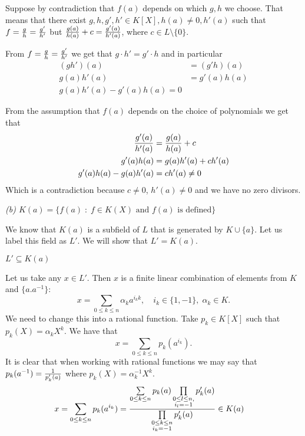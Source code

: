 \documentclass{article}
\begin{document}



Suppose by contradiction that $f(a)$ depends on which $g,h$ we choose. That means that there exist $g,h, g',h'\in K[X], h(a)\neq 0, h'(a)$ such that $f={g\over h}={g'\over h'}$ but ${g(a)\over h(a)}+c= {g'(a)\over h'(a)}$, where $c\in L\setminus\{0\}$. 

From $f={g\over h}={g'\over h'}$ we get that $g\cdot h'=g'\cdot h$ and in particular
\begin{align*}
    (gh')(a)&=(g'h)(a)\\
    g(a)h'(a)&=g'(a)h(a)\\
    g(a)h'(a)-g'(a)h(a)=0
\end{align*}

From the assumption that $f(a)$ depends on the choice of polynomials we get that 
\begin{align*}
    {g'(a)\over h'(a)}&={g(a)\over h(a)}+c\\
    g'(a)h(a)&=g(a)h'(a)+ch'(a)\\
    g'(a)h(a)-g(a)h'(a)&=ch'(a)\neq 0
\end{align*}
Which is a contradiction because $c\neq 0$, $h'(a)\neq 0$ and we have no zero divisors.
\smallskip


\emph{\color{pink}(b) $K(a)=\{f(a)\;:\;f\in K(X)\text{ and }f(a)\text{ is defined}\}$}

We know that $K(a)$ is a subfield of $L$ that is generated by $K\cup\{a\}$. Let us label this field as $L'$. We will show that $L'=K(a)$.

$L'\subseteq K(a)$

Let us take any $x\in L'$. Then $x$ is a finite linear combination of elements from $K$ and $\{a. a^{-1}\}$:
$$x=\sum\limits_{0\leq k\leq n}\alpha_k a^{i_kk},\quad i_k\in\{1,-1\},\;\alpha_k\in K.$$
We need to change this into a rational function. Take $p_k\in K[X]$ such that $p_k(X)=\alpha_kX^k$. We have that
$$x=\sum\limits_{0\leq k\leq n}p_k(a^{i_k}).$$
It is clear that when working with rational functions we may say that $p_k(a^{-1})={1\over p_k'(a)}$ where $p_k(X)=\alpha_k^{-1}X^k$.
\begin{align*}
    x&=\sum\limits_{0\leq k\leq n}p_k(a^{i_k})={\sum\limits_{0\leq k\leq n}p_k(a)\prod\limits_{\substack{0\leq l\leq n,\\ i_l=-1}}p_k'(a)\over\prod\limits_{\substack{0\leq k\leq n\\i_k=-1}}p_k'(a)}\in K(a)
\end{align*}
\end{document}
